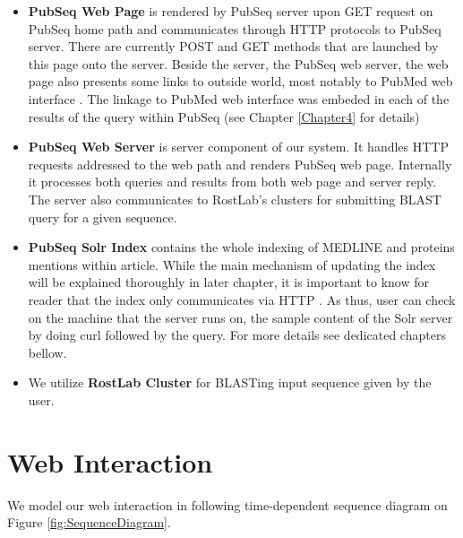 \begin{itemize}
\item \textbf{PubSeq Web Page} is rendered by PubSeq server upon GET request on PubSeq home path and communicates through HTTP protocols to PubSeq server. There are currently POST and GET methods that are launched by this page onto the server. Beside the server, the PubSeq web server, the web page also presents some links to outside world, most notably to PubMed web interface \citep{MELDINEWeb}. The linkage to PubMed web interface was embeded in each of the results of the query within PubSeq (see Chapter \ref{Chapter4} for details)
\item \textbf{PubSeq Web Server} is server component of our system. It handles HTTP requests addressed to the web path and renders PubSeq web page. Internally it processes both queries and results from both web page and server reply. The server also communicates to RostLab's clusters for submitting BLAST query for a given sequence.
\item \textbf{PubSeq Solr Index} contains the whole indexing of MEDLINE and proteins mentions within article. While the main mechanism of updating the index will be explained thoroughly in later chapter, it is important to know for reader that the index only communicates via HTTP \citep{smiley2015apache}. As thus, user can check on the machine that the server runs on, the sample content of the Solr server by doing curl followed by the query. For more details see dedicated chapters bellow.
\item We utilize \textbf{RostLab Cluster} for BLASTing input sequence given by the user.
\end{itemize}


\section{Web Interaction}

We model our web interaction in following time-dependent sequence diagram \citep{rumbaugh2004unified} on Figure \ref{fig:SequenceDiagram}.

